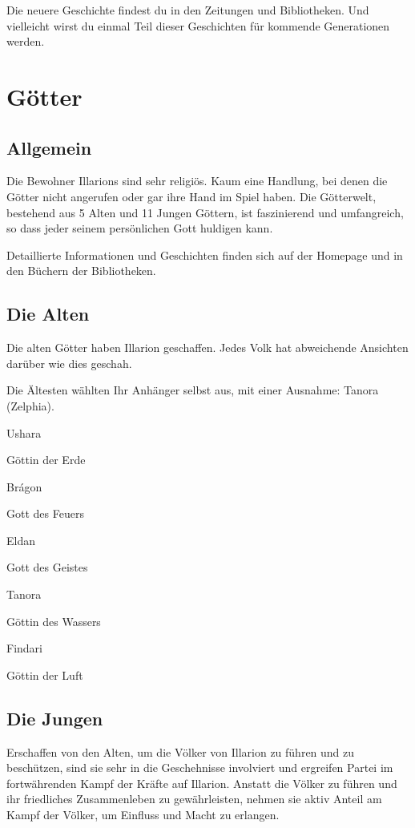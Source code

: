 \documentclass[a4paper,11pt]{book}
\begin{document}
Die neuere Geschichte findest du in den Zeitungen und Bibliotheken. Und vielleicht wirst du einmal Teil dieser Geschichten für kommende Generationen werden.

\section{Götter}

\subsection{Allgemein}

Die Bewohner Illarions sind sehr religiös. Kaum eine Handlung, bei denen die Götter nicht angerufen oder gar ihre Hand im Spiel haben. Die Götterwelt, bestehend aus 5 Alten und 11 Jungen Göttern, ist faszinierend und umfangreich, so dass jeder seinem persönlichen Gott huldigen kann.

Detaillierte Informationen und Geschichten finden sich auf der Homepage und in den Büchern der Bibliotheken.

\subsection{Die Alten}

Die alten Götter haben Illarion geschaffen. Jedes Volk hat abweichende Ansichten darüber wie dies geschah.

Die Ältesten wählten Ihr Anhänger selbst aus, mit einer Ausnahme: Tanora (Zelphia).

Ushara

Göttin der Erde

Brágon

Gott des Feuers

Eldan

Gott des Geistes

Tanora

Göttin des Wassers

Findari

Göttin der Luft

\subsection{Die Jungen}

Erschaffen von den Alten, um die Völker von Illarion zu führen und zu beschützen, sind sie sehr in die Geschehnisse involviert und ergreifen Partei im fortwährenden Kampf der Kräfte auf Illarion. Anstatt die Völker zu führen und ihr friedliches Zusammenleben zu gewährleisten, nehmen sie aktiv Anteil am Kampf der Völker, um Einfluss und Macht zu erlangen.
\end{document}
